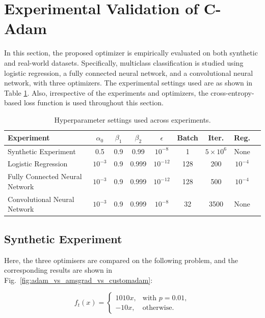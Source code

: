 \documentclass[12pt]{article}
\begin{document}
\section{Experimental Validation of C-Adam}\label{exp}

In this section, the proposed optimizer is empirically evaluated on both synthetic and real-world datasets. Specifically, multiclass classification is studied using logistic regression, a fully connected neural network, and a convolutional neural network, with three optimizers. The experimental settings used are as shown in Table \ref{tldr hyperparameter}. Also, irrespective of the experiments and optimizers, the cross-entropy-based loss function is used throughout this section.


\begin{table}[]
\centering
\caption{Hyperparameter settings used across experiments.}
\label{tldr hyperparameter}
\small
\begin{tabular}{p{3.2cm}cccccccc}
\toprule
\textbf{Experiment} & $\alpha_0$ & $\beta_1$ & $\beta_2$ & $\epsilon$ & Batch & Iter. & Reg. \\
\midrule
Synthetic Experiment & 0.5 & 0.9 & 0.99 & $10^{-8}$  & 1 & $5\times 10^6$ & None \\
Logistic Regression & $10^{-3}$ & 0.9 & 0.999 & $10^{-12}$ & 128 & 200 & $10^{-4}$ \\
Fully Connected Neural Network & $10^{-3}$ & 0.9 & 0.999 & $10^{-12}$ & 128 & 500 & $10^{-4}$ \\
Convolutional Neural Network & $10^{-3}$ & 0.9 & 0.999 & $10^{-8}$ & 32 & 3500 & None \\
\bottomrule
\end{tabular}
\end{table}

\subsection{Synthetic Experiment}\label{syn exp section}

Here, the three optimisers are compared on the following problem, and the corresponding results are shown in Fig.~\ref{fig:adam_vs_amsgrad_vs_customadam}:

\begin{equation}\label{synthetic exp}
f_t(x) =
\begin{cases}
1010x, & \text{with } p=0.01, \\
-10x, & \text{otherwise}.
\end{cases}
\end{equation}
\end{document}
